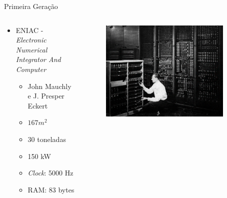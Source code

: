 \documentclass[aspectratio=169,
				xcolor=table]{beamer}
\begin{document}
	\begin{frame}[t]{Primeira Geração}
		\begin{columns}[t]
			\begin{column}{0.6\textwidth}
				\begin{itemize}
					\item ENIAC - \textit{Electronic Numerical Integrator And Computer}
					\begin{itemize}
						\item John Mauchly e J. Presper Eckert
						\item $167 m^2$
						\item 30 toneladas
						\item 150 kW
						\item \textit{Clock}: 5000 Hz
						\item RAM: 83 bytes
					\end{itemize}
				\end{itemize}
			\end{column}
			\begin{column}{0.4\textwidth}
				\begin{figure}
					\includegraphics[width=0.9\textwidth, keepaspectratio]{../figs/cap03/eniac} 			
				\end{figure}
			\end{column}
		\end{columns}
	\end{frame}
	
\end{document}
